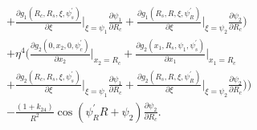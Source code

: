 \documentclass[12pt]{article}
\begin{document}
\begin{align}
&+\frac{\partial g_1(R_c,R_s,\xi,\psi_s^{\prime})}{\partial\xi}\bigg|_{\xi=\psi_1}\frac{\partial\psi_1}{\partial R_c}+\frac{\partial g_1(R_s,R,\xi,\psi_R^{\prime})}{\partial\xi}\bigg|_{\xi=\psi_2}\frac{\partial\psi_2}{\partial R_c}\bigg)\nonumber\\
&+\eta^4\bigg(\frac{\partial g_2(0,x_2,0,\psi_c^{\prime})}{\partial x_2}\bigg|_{x_2=R_c}+\frac{\partial g_2(x_1,R_s,\psi_1,\psi_s^{\prime})}{\partial x_1}\bigg|_{x_1=R_c}\nonumber\\
&+\frac{\partial g_2(R_c,R_s,\xi,\psi_s^{\prime})}{\partial\xi}\bigg|_{\xi=\psi_1}\frac{\partial\psi_1}{\partial R_c}+\frac{\partial g_2(R_s,R,\xi,\psi_R^{\prime})}{\partial\xi}\bigg|_{\xi=\psi_2}\frac{\partial\psi_2}{\partial R_c}\bigg)\bigg)\nonumber\\
&-\frac{(1+k_{24})}{R^2}\cos(\psi_R^{\prime}R+\psi_2)\frac{\partial\psi_2}{\partial R_c}.\label{eq:dEdRc}
\end{align}
\end{document}
